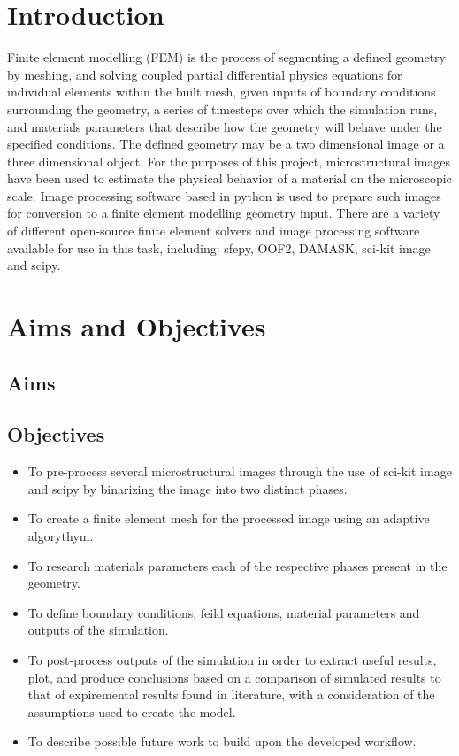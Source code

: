 \documentclass[\report.tex]{subfiles}
\begin{document}
\section{Introduction}
Finite element modelling (FEM) is the process of segmenting a defined geometry by meshing, and solving coupled partial differential physics equations for individual elements within the built mesh, given inputs of boundary conditions surrounding the geometry, a series of timesteps over which the simulation runs, and materials parameters that describe how the geometry will behave under the specified conditions. The defined geometry may be a two dimensional image or a three dimensional object. For the purposes of this project, microstructural images have been used to estimate the physical behavior of a material on the microscopic scale. Image processing software based in python is used to prepare such images for conversion to a finite element modelling geometry input. There are a variety of different open-source finite element solvers and image processing software available for use in this task, including: sfepy, OOF2, DAMASK, sci-kit image and scipy.

\section{Aims and Objectives}
\subsection{Aims}



\subsection{Objectives}

\begin{itemize}
  \item To pre-process several microstructural images through the use of sci-kit image and scipy by binarizing the image into two distinct phases.
  \item To create a finite element mesh for the processed image using an adaptive algorythym.
  \item To research materials parameters each of the respective phases present in the geometry.
  \item To define boundary conditions, feild equations, material parameters and outputs of the simulation.
  \item To post-process outputs of the simulation in order to extract useful results, plot, and produce conclusions based on a comparison of simulated results to that of expiremental results found in literature, with a consideration of the assumptions used to create the model.
  \item To describe possible future work to build upon the developed workflow.
\end{itemize}
\end{document}
